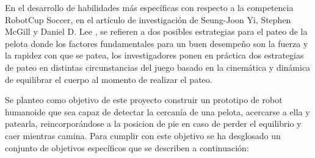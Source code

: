 En el desarrollo de habilidades más específicas con respecto a la competencia RobotCup Soccer, en el artículo de investigación de Seung-Joon Yi, Stephen McGill y Daniel D. Lee  \cite{paper2}, se refieren a dos posibles estrategias para el pateo de la pelota donde los factores fundamentales para un buen desempeño son la fuerza y la rapidez con que se patea, los investigadores ponen en pr\'actica dos estrategias de pateo en distintas circunstancias del juego basado en la cinemática y dinámica de equilibrar el cuerpo al momento de realizar el pateo.

Se planteo como objetivo de este proyecto construir un prototipo de robot humanoide que sea capaz de detectar la cercanía de una pelota, acercarse a ella y patearla, reincorpor\'andose a la posicion de pie en caso de perder el equilibrio y caer mientras camina. Para cumplir con este objetivo se ha desglosado un conjunto de objetivos específicos que se describen a continuación: 

